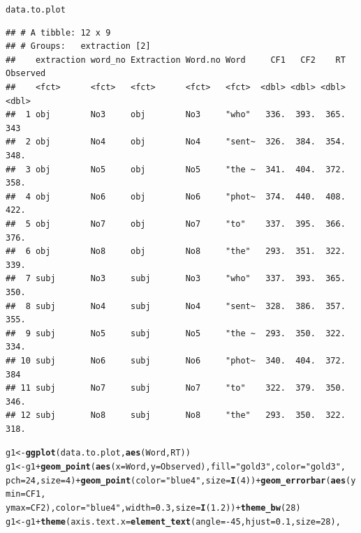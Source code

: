 \documentclass{article}\usepackage[]{graphicx}\usepackage[]{color}
\makeatletter
\newcommand{\hlnum}[1]{\textcolor[rgb]{0.686,0.059,0.569}{#1}}%
\newcommand{\hlstr}[1]{\textcolor[rgb]{0.192,0.494,0.8}{#1}}%
\newcommand{\hlopt}[1]{\textcolor[rgb]{0,0,0}{#1}}%
\newcommand{\hlstd}[1]{\textcolor[rgb]{0.345,0.345,0.345}{#1}}%
\newcommand{\hlkwb}[1]{\textcolor[rgb]{0.69,0.353,0.396}{#1}}%
\newcommand{\hlkwc}[1]{\textcolor[rgb]{0.333,0.667,0.333}{#1}}%
\newcommand{\hlkwd}[1]{\textcolor[rgb]{0.737,0.353,0.396}{\textbf{#1}}}%
\newenvironment{kframe}{%
 \def\at@end@of@kframe{}%
 \ifinner\ifhmode%
  \def\at@end@of@kframe{\end{minipage}}%
  \begin{minipage}{\columnwidth}%
 \fi\fi%
 \def\FrameCommand##1{\hskip\@totalleftmargin \hskip-\fboxsep
 \colorbox{shadecolor}{##1}\hskip-\fboxsep
     \hskip-\linewidth \hskip-\@totalleftmargin \hskip\columnwidth}%
 \MakeFramed {\advance\hsize-\width
   \@totalleftmargin\z@ \linewidth\hsize
   \@setminipage}}%
 {\par\unskip\endMakeFramed%
 \at@end@of@kframe}
\newenvironment{knitrout}{}{} %
\makeatother
\begin{document}
\begin{knitrout}
\begin{kframe}
{\ttfamily\noindent\itshape\color{messagecolor}{\#\# `summarise()` has grouped output by 'extraction'. You can override using the `.groups` argument.}}\begin{alltt}
\hlstd{data.to.plot}
\end{alltt}
\begin{verbatim}
## # A tibble: 12 x 9
## # Groups:   extraction [2]
##    extraction word_no Extraction Word.no Word     CF1   CF2    RT Observed
##    <fct>      <fct>   <fct>      <fct>   <fct>  <dbl> <dbl> <dbl>    <dbl>
##  1 obj        No3     obj        No3     "who"   336.  393.  365.     343 
##  2 obj        No4     obj        No4     "sent~  326.  384.  354.     348.
##  3 obj        No5     obj        No5     "the ~  341.  404.  372.     358.
##  4 obj        No6     obj        No6     "phot~  374.  440.  408.     422.
##  5 obj        No7     obj        No7     "to"    337.  395.  366.     376.
##  6 obj        No8     obj        No8     "the"   293.  351.  322.     339.
##  7 subj       No3     subj       No3     "who"   337.  393.  365.     350.
##  8 subj       No4     subj       No4     "sent~  328.  386.  357.     355.
##  9 subj       No5     subj       No5     "the ~  293.  350.  322.     334.
## 10 subj       No6     subj       No6     "phot~  340.  404.  372.     384 
## 11 subj       No7     subj       No7     "to"    322.  379.  350.     346.
## 12 subj       No8     subj       No8     "the"   293.  350.  322.     318.
\end{verbatim}
\begin{alltt}
\hlstd{g1} \hlkwb{<-} \hlkwd{ggplot}\hlstd{(data.to.plot,} \hlkwd{aes}\hlstd{(Word, RT))}
\hlstd{g1} \hlkwb{<-} \hlstd{g1} \hlopt{+} \hlkwd{geom_point}\hlstd{(}\hlkwd{aes}\hlstd{(}\hlkwc{x} \hlstd{= Word,} \hlkwc{y} \hlstd{= Observed),} \hlkwc{fill} \hlstd{=} \hlstr{"gold3"}\hlstd{,} \hlkwc{color} \hlstd{=} \hlstr{"gold3"}\hlstd{,}
    \hlkwc{pch} \hlstd{=} \hlnum{24}\hlstd{,} \hlkwc{size} \hlstd{=} \hlnum{4}\hlstd{)} \hlopt{+} \hlkwd{geom_point}\hlstd{(}\hlkwc{color} \hlstd{=} \hlstr{"blue4"}\hlstd{,} \hlkwc{size} \hlstd{=} \hlkwd{I}\hlstd{(}\hlnum{4}\hlstd{))} \hlopt{+} \hlkwd{geom_errorbar}\hlstd{(}\hlkwd{aes}\hlstd{(}\hlkwc{ymin} \hlstd{= CF1,}
    \hlkwc{ymax} \hlstd{= CF2),} \hlkwc{color} \hlstd{=} \hlstr{"blue4"}\hlstd{,} \hlkwc{width} \hlstd{=} \hlnum{0.3}\hlstd{,} \hlkwc{size} \hlstd{=} \hlkwd{I}\hlstd{(}\hlnum{1.2}\hlstd{))} \hlopt{+} \hlkwd{theme_bw}\hlstd{(}\hlnum{28}\hlstd{)}
\hlstd{g1} \hlkwb{<-} \hlstd{g1} \hlopt{+} \hlkwd{theme}\hlstd{(}\hlkwc{axis.text.x} \hlstd{=} \hlkwd{element_text}\hlstd{(}\hlkwc{angle} \hlstd{=} \hlopt{-}\hlnum{45}\hlstd{,} \hlkwc{hjust} \hlstd{=} \hlnum{0.1}\hlstd{,} \hlkwc{size} \hlstd{=} \hlnum{28}\hlstd{),}

\end{alltt}
\end{kframe}
\end{knitrout}
\end{document}
